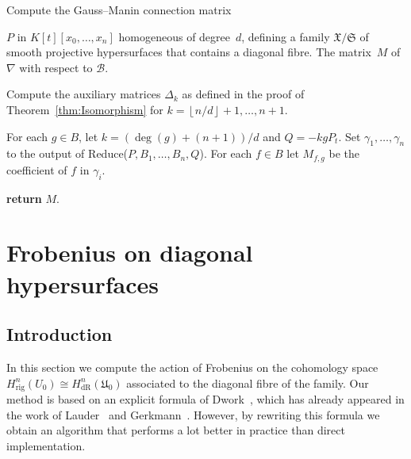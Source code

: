 \documentclass[a4paper,11pt]{article}
\numberwithin{equation}{section}
\providecommand{\floor}[1]{\left\lfloor#1\right\rfloor}   %
\providecommand{\HdR}{H_{\text{dR}}}    %
\providecommand{\Hrig}{H_{\text{rig}}}  %
\providecommand{\cB}{\mathcal{B}} %
\theoremstyle{definition}
\begin{document}
\begin{algorithm}
\caption{Compute the Gauss--Manin connection matrix}
\label{alg:Connection}
\begin{algorithmic}
\Require $P$ in $K[t][x_0, \dotsc, x_n]$ homogeneous of degree~$d$, 
         defining a family $\mathfrak{X}/\mathfrak{S}$ of smooth projective 
         hypersurfaces that contains a diagonal fibre.
\Ensure  The matrix~$M$ of $\nabla$ with respect to $\cB$.
\State \begin{compactenum}[\it {Step} I.] \vspace{-1.24em}
\item Compute the auxiliary matrices $\Delta_k$  as defined 
      in the proof of Theorem~\ref{thm:Isomorphism}
      for $k = \floor{n/d}+1, \dotsc, n+1$.
\item For each $g \in B$, let $k = (\deg(g)+(n+1))/d$ and $Q = - k g P_t$. 
      Set $\gamma_{1}, \dotsc, \gamma_n$ to the output of 
      {\sc Reduce($P, B_1, \dotsc, B_n, Q$)}. For each $f \in B$ let $M_{f,g}$ 
      be the coefficient of $f$ in $\gamma_i$.
\item \textbf{return} $M$.
\end{compactenum}
\EndProcedure
\end{algorithmic}
\end{algorithm}



\section{Frobenius on diagonal hypersurfaces}
\label{sec:Diagonal}

\subsection{Introduction}

In this section we compute the action of Frobenius on the cohomology 
space $\Hrig^{n}(U_0) \cong \HdR^{n}(\mathfrak{U}_0)$ associated 
to the diagonal fibre of the family. Our method is based on an 
explicit formula of Dwork~\citep[\S 4]{Dwork1964}, which has already 
appeared in the work of Lauder~\citep[\S 6]{Lauder2004b} and 
Gerkmann~\citep[\S 4.4]{Gerkmann2007}. However, by rewriting this formula 
we obtain an algorithm that performs a lot better in practice than direct 
implementation.
\end{document}
